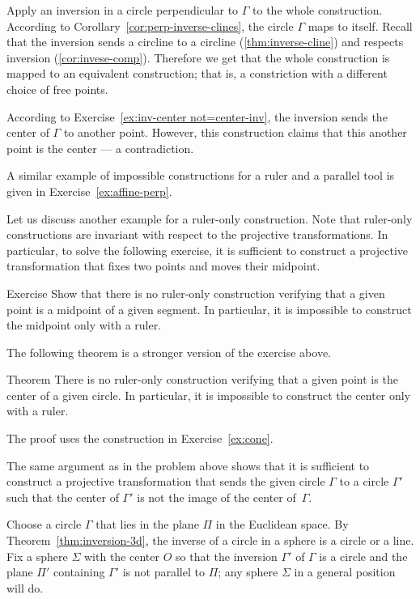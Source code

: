 Apply an inversion in a circle perpendicular to $\Gamma$ to the whole construction.
According to Corollary~\ref{cor:perp-inverse-clines},
the circle
$\Gamma$ maps to itself.
Recall that the inversion sends a circline to a circline (\ref{thm:inverse-cline}) and respects inversion (\ref{cor:invese-comp}).
Therefore we get that the whole  construction is mapped to an equivalent construction; 
that is, a constriction with a different choice of free points.

According to Exercise~\ref{ex:inv-center not=center-inv}, 
the inversion sends the center of $\Gamma$ to another point.
However, this construction claims that this another point is the center --- a contradiction.
\qeds

A similar example of impossible constructions for a ruler and a parallel tool
 is given in Exercise~\ref{ex:affine-perp}.
 
Let us discuss another example for a ruler-only construction.
Note that ruler-only constructions are invariant with respect to the projective transformations. 
In particular, to solve the following exercise, it is sufficient to construct a projective transformation that fixes two points and moves their midpoint.

\begin{thm}{Exercise}\label{ex:midpoint-proj}
Show that there is no ruler-only construction verifying that a given point is a  midpoint of a given segment.
In particular, it is impossible to construct the midpoint only with a ruler.
\end{thm}

The following theorem is a stronger version of the exercise above.

\begin{thm}{Theorem}\label{thm:circle-center-proj}
There is no ruler-only construction verifying that a given point is the center of a given circle.
In particular, it is impossible to construct the center only with a ruler.
\end{thm}

The proof uses the construction in Exercise~\ref{ex:cone}.

The same argument as in the problem above shows that 
it is sufficient to construct a projective transformation 
that sends the given circle $\Gamma$ to a circle $\Gamma'$ such that the center of $\Gamma'$ is not the image of the center of~$\Gamma$.

Choose a circle $\Gamma$ that lies in the plane $\Pi$ in the Euclidean space.
By Theorem~\ref{thm:inversion-3d}, 
the inverse of a circle in a sphere is a circle or a line.
Fix a sphere $\Sigma$ with the center $O$ so that the inversion $\Gamma'$ of $\Gamma$
is a circle and the plane $\Pi'$ containing $\Gamma'$ is not parallel to $\Pi$;
any sphere $\Sigma$ in a general position will do.

